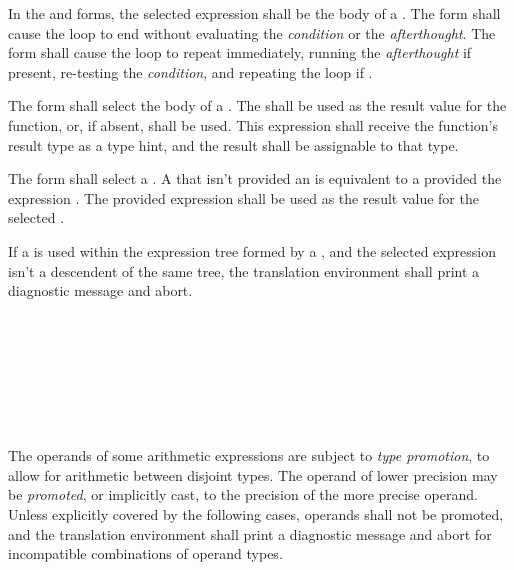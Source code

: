 \specsubsubitem
In the  and  forms, the selected expression
shall be the body of a . The  form shall
cause the loop to end without evaluating the \textit{condition} or the
\textit{afterthought}. The  form shall cause the loop to
repeat immediately, running the \textit{afterthought} if present, re-testing the
\textit{condition}, and repeating the loop if .

\specsubsubitem
The  form shall select the body of a
. The  shall be used
as the result value for the function, or, if absent,  shall be
used. This expression shall receive the function's result type as a type hint,
and the result shall be assignable to that type.

\specsubsubitem
The  form shall select a
. A  that isn't
provided an  is equivalent to a
 provided the expression . The
provided expression shall be used as the result value for the selected
.

\specsubsubitem
If a  is used within the expression tree formed
by a , and the selected expression isn't a
descendent of the same tree, the translation environment shall print a
diagnostic message and abort.


\begin{grammar}
 \\
	 \\
	 \\
	 \\
	 \\
	 \\
\end{grammar}


\specsubitem
The operands of some arithmetic expressions are subject to \textit{type
promotion}, to allow for arithmetic between disjoint types. The operand of
lower precision may be \textit{promoted}, or implicitly cast, to the precision
of the more precise operand. Unless explicitly covered by the following cases,
operands shall not be promoted, and the translation environment shall print a
diagnostic message and abort for incompatible combinations of operand types.


